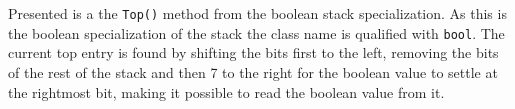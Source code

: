 Presented is a the \lstinline|Top()| method from the boolean stack specialization.
As this is the boolean specialization of the stack the class name is qualified with \texttt{bool}. 
The current top entry is found by shifting the bits first to the left, removing the bits of the rest of the stack and then 7 to the right for the boolean value to settle at the rightmost bit, making it possible to read the boolean value from it.





